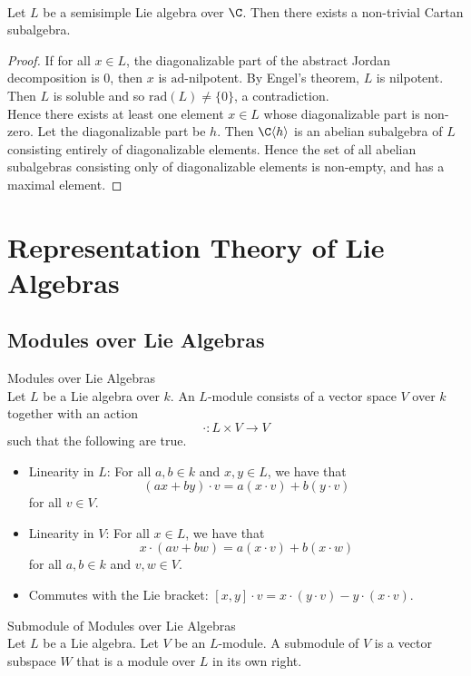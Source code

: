 \documentclass[a4paper]{article}
\begin{document}
\begin{lmm}{}{} \\Let $L$ be a semisimple Lie algebra over $\C$. Then there exists a non-trivial Cartan subalgebra. 
\begin{proof}
If for all $x\in L$, the diagonalizable part of the abstract Jordan decomposition is $0$, then $x$ is $\text{ad}$-nilpotent. By Engel's theorem, $L$ is nilpotent. Then $L$ is soluble and so $\text{rad}(L)\neq\{0\}$, a contradiction. \\

Hence there exists at least one element $x\in L$ whose diagonalizable part is non-zero. Let the diagonalizable part be $h$. Then $\C\langle h\rangle$ is an abelian subalgebra of $L$ consisting entirely of diagonalizable elements. Hence the set of all abelian subalgebras consisting only of diagonalizable elements is non-empty, and has a maximal element. 
\end{proof}
\end{lmm}

\pagebreak
\section{Representation Theory of Lie Algebras}
\subsection{Modules over Lie Algebras}
\begin{defn}{Modules over Lie Algebras}{} \\Let $L$ be a Lie algebra over $k$. An $L$-module consists of a vector space $V$ over $k$ together with an action $$\cdot:L\times V\to V$$ such that the following are true. 
\begin{itemize}
\item Linearity in $L$: For all $a,b\in k$ and $x,y\in L$, we have that $$(ax+by)\cdot v=a(x\cdot v)+b(y\cdot v)$$ for all $v\in V$. 
\item Linearity in $V$: For all $x\in L$, we have that $$x\cdot(av+bw)=a(x\cdot v)+b(x\cdot w)$$ for all $a,b\in k$ and $v,w\in V$. 
\item Commutes with the Lie bracket: $[x,y]\cdot v=x\cdot(y\cdot v)-y\cdot(x\cdot v)$. 
\end{itemize}
\end{defn}

\begin{defn}{Submodule of Modules over Lie Algebras}{} \\Let $L$ be a Lie algebra. Let $V$ be an $L$-module. A submodule of $V$ is a vector subspace $W$ that is a module over $L$ in its own right. 
\end{defn}
\end{document}
